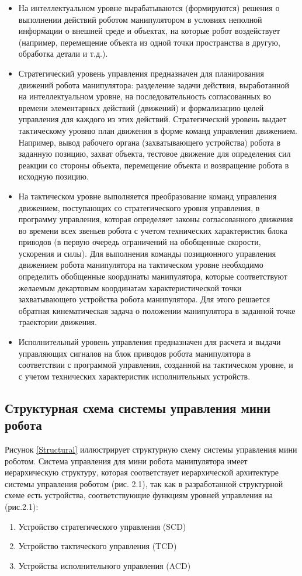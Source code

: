 \begin{itemize}
	\item На интеллектуальном уровне вырабатываются (формируются) решения о выполнении действий роботом манипулятором в условиях неполной информации о внешней среде и объектах, на которые робот воздействует (например, перемещение объекта из одной точки пространства в другую, обработка детали и т.д.).
	\item Стратегический уровень управления предназначен для планирования движений робота манипулятора: разделение задачи действия, выработанной на интеллектуальном уровне, на последовательность согласованных во времени элементарных действий (движений) и формализацию целей управления для каждого из этих действий. Стратегический уровень выдает тактическому уровню план движения в форме команд управления движением. Например, вывод рабочего органа (захватывающего устройства) робота в заданную позицию, захват объекта, тестовое движение для определения сил реакции со стороны объекта, перемещение объекта и возвращение робота в исходную позицию.
	\item На тактическом уровне выполняется преобразование команд управления движением, поступающих со стратегического уровня управления, в программу управления, которая определяет законы согласованного движения во времени всех звеньев робота с учетом технических характеристик блока приводов (в первую очередь ограничений на обобщенные скорости, ускорения и силы). Для выполнения команды позиционного управления движением робота манипулятора на тактическом уровне необходимо определить обобщенные координаты манипулятора, которые соответствуют желаемым декартовым координатам характеристической точки захватывающего устройства робота манипулятора. Для этого решается обратная кинематическая задача о положении манипулятора в заданной точке траектории движения.
	\item Исполнительный уровень управления предназначен для расчета и выдачи управляющих сигналов на блок приводов робота манипулятора в соответствии с программой управления, созданной на тактическом уровне, и с учетом технических характеристик исполнительных устройств.
\end{itemize}

\subsection{Структурная схема системы управления мини робота}

Рисунок \ref{Structural} иллюстрирует структурную схему системы управления мини роботом. Система управления для мини робота манипулятора имеет иерархическую структуру, которая соответствует иерархической архитектуре системы управления роботом (рис. 2.1), так как в разработанной структурной схеме есть устройства, соответствующие функциям уровней управления на (рис.2.1):
\begin{enumerate}
	\item  Устройство стратегического управления (SCD)
	\item  Устройство тактического управления (TCD)
	\item  Устройства исполнительного управления (ACD)
\end{enumerate}

